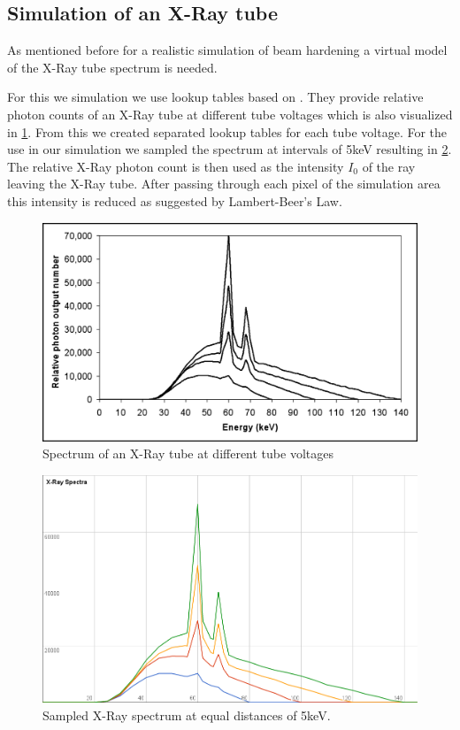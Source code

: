 \subsection{Simulation of an X-Ray tube}
\par As mentioned before for a realistic simulation of beam hardening a virtual model of the X-Ray tube spectrum is needed.\cite{XRayTubeSpectrum}
\par For this we simulation we use lookup tables based on \cite{XRayTubeSpectrum}. They provide relative photon counts of an X-Ray tube at different tube voltages which is also visualized in \ref{f5}. From this we created separated lookup tables for each tube voltage. For the use in our simulation we sampled the spectrum at intervals of 5keV resulting in \ref{SampledTubeSpectrum}. The relative X-Ray photon count is then used as the intensity \(I_{0}\) of the ray leaving the X-Ray tube. After passing through each pixel of the simulation area this intensity is reduced as suggested by Lambert-Beer's Law.
\begin{figure}[h!]
	\centering
	\includegraphics[width=0.6\linewidth]{images/F5large.jpg}
	\caption{Spectrum of an X-Ray tube at different tube voltages\cite{XRayTubeSpectrum}}
	\label{f5}
\end{figure}
\begin{figure}[h!]
	\centering
	\includegraphics[width=0.5\linewidth]{images/tubeSpectrum.png}
	\caption{Sampled X-Ray spectrum at equal distances of 5keV.}
	\label{SampledTubeSpectrum}
\end{figure}
